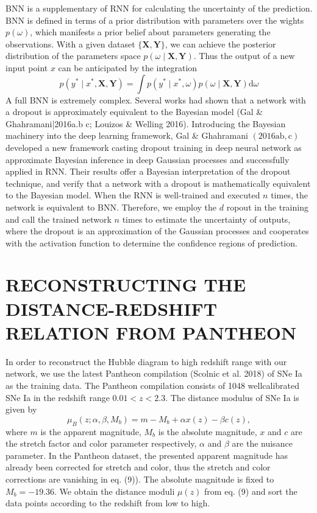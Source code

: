 \documentclass[10pt, a4paper]{article}
\begin{document}
BNN is a supplementary of RNN for calculating the uncertainty of the prediction. BNN is defined in terms of a prior distribution with parameters over the wights $p(\omega)$, which manifests a prior belief about parameters generating the observations. With a given dataset $\{\mathbf{X}, \mathbf{Y}\}$, we can achieve the posterior distribution of the parameters space $p(\omega \mid \mathbf{X}, \mathbf{Y})$. Thus the output of a new input point $x$ can be anticipated by the integration
$$
p\left(y^{*} \mid x^{*}, \mathbf{X}, \mathbf{Y}\right)=\int p\left(y^{*} \mid x^{*}, \omega\right) p(\omega \mid \mathbf{X}, \mathbf{Y}) \mathrm{d} \omega
$$
A full BNN is extremely complex. Several works had shown that a network with a dropout is approximately equivalent to the Bayesian model (Gal \& Ghahramani|2016a.b c; Louizos \& Welling 2016). Introducing the Bayesian machinery into the deep learning framework, Gal \& Ghahramani $(2016 \mathrm{a} \mathrm{b}, \mathrm{c})$ developed a new framework casting dropout training in deep neural network as approximate Bayesian inference in deep Gaussian processes and successfully applied in RNN. Their results offer a Bayesian interpretation of the dropout technique, and verify that a network with a dropout is mathematically equivalent to the Bayesian model. When the RNN is well-trained and executed $n$ times, the network is equivalent to BNN. Therefore, we employ the $d$ ropout in the training and call the trained network $n$ times to estimate the uncertainty of outputs, where the dropout is an approximation of the Gaussian processes and cooperates with the activation function to determine the confidence regions of prediction.

\section{RECONSTRUCTING THE DISTANCE-REDSHIFT RELATION FROM PANTHEON}
In order to reconstruct the Hubble diagram to high redshift range with our network, we use the latest Pantheon compilation (Scolnic et al. 2018) of SNe Ia as the training data. The Pantheon compilation consists of 1048 wellcalibrated SNe Ia in the redshift range $0.01<z<2.3$. The distance modulus of SNe Ia is given by
$$
\mu_{B}\left(z ; \alpha, \beta, M_{b}\right)=m-M_{b}+\alpha x(z)-\beta c(z),
$$
where $m$ is the apparent magnitude, $M_{b}$ is the absolute magnitude, $x$ and $c$ are the stretch factor and color parameter respectively, $\alpha$ and $\beta$ are the nuisance parameter. In the Pantheon dataset, the presented apparent magnitude has already been corrected for stretch and color, thus the stretch and color corrections are vanishing in eq. (9)). The absolute magnitude is fixed to $M_{b}=-19.36$. We obtain the distance moduli $\mu(z)$ from eq. (9) and sort the data points according to the redshift from low to high.
\end{document}
